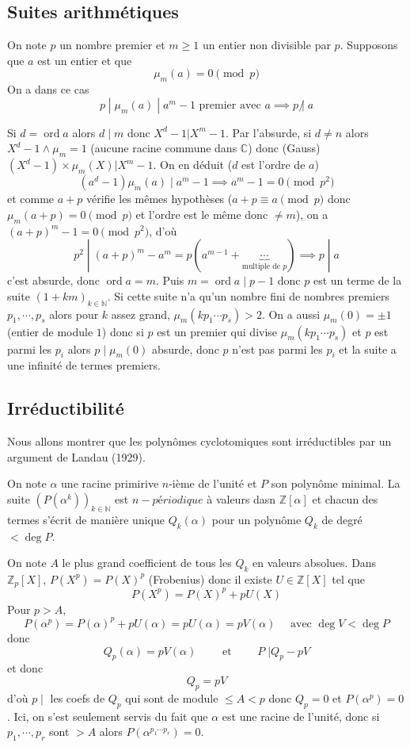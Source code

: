 \documentclass{article}
\theoremstyle{definition}
\DeclareMathOperator{\ord}{ord}
\begin{document}
\subsection{Suites arithmétiques}

On note $p$ un nombre premier et $m\geq 1$ un entier non divisible par $p$. Supposons que $a$ est un entier et que \[
    \mu_m(a)= 0\pmod p
\]
On a dans ce cas \[
    p\;|\;\mu_m(a)\;|\;a^m-1 \text{ premier avec }a \implies p\;\not|\;a
\]

Si $d=\ord a$ alors $d\;|\; m$ donc $X^d-1|X^m-1$. Par l'absurde, si $d\neq n$ alors $X^d-1\land \mu_m=1$ (aucune racine commune dans $\mathbb C$) donc (Gauss) $(X^d-1)\times \mu_m(X)|X^m-1$. On en déduit ($d$ est l'ordre de $a$) \[
    (a^d-1)\mu_m(a)\;|\;a^m-1 \implies a^m-1=0\pmod {p^2}
\]
et comme $a+p$ vérifie les mêmes hypothèses ($a+p\equiv a\pmod p$ donc $\mu_m(a+p)=0\pmod {p}$ et l'ordre est le même donc $\neq m$), on a $(a+p)^m-1= 0\pmod {p^2}$, d'où \[
    p^2\;|\; (a+p)^m-a^m=p\left(a^{m-1}+\underbrace{\cdots}_{\text{multiple de }p}\right) \implies p\;|\; a
\]
c'est absurde, donc $\ord a = m$. Puis $m=\ord a\;|\;p-1$ donc $p$ est un terme de la suite $(1+km)_{k\in\mathbb N}$. Si cette suite n'a qu'un nombre fini de nombres premiers $p_1, \cdots, p_s$ alors pour $k$ assez grand, $\mu_m(kp_1\cdots p_s)>2$. On a aussi $\mu_m(0)=\pm 1$ (entier de module $1$) donc si $p$ est un premier qui divise $\mu_m(kp_1\cdots p_s)$ et $p$ est parmi les $p_i$ alors $p\;|\; \mu_m(0)$ absurde, donc $p$ n'est pas parmi les $p_i$ et la suite a une infinité de termes premiers.

\subsection{Irréductibilité}

Nous allons montrer que les polynômes cyclotomiques sont irréductibles par un argument de Landau (1929).

On note $\alpha$ une racine primirive $n$-ième de l'unité et $P$ son polynôme minimal. La suite $(P(\alpha^k))_{k\in\mathbb N}$ est $n-périodique$ à valeurs dasn $\mathbb Z[\alpha]$ et chacun des termes s'écrit  de manière unique $Q_k(\alpha)$ pour un polynôme $Q_k$ de degré $<\deg P$.

On note $A$ le plus grand coefficient de tous les $Q_k$ en valeurs absolues. Dans $\mathbb Z_p[X]$, $P(X^p)=P(X)^p$ (Frobenius) donc il existe $U\in\mathbb Z[X]$ tel que \[
    P(X^p)=P(X)^p+pU(X)
\]
Pour $p>A$, \[
    P(\alpha^p)=P(\alpha)^p+pU(\alpha)=pU(\alpha)=pV(\alpha) \quad \text{ avec }\deg V<\deg P
\]
donc \[
    Q_p(\alpha)=pV(\alpha) \qquad \text{ et }\qquad P\;|Q_p-pV
\]
et donc \[
    Q_p=pV
\]
d'où $p\;|\;$ les coefs de $Q_p$ qui sont de module $\leq A<p$ donc $Q_p=0$ et $P(\alpha^p)=0$. Ici, on s'est seulement servis du fait que $\alpha$ est une racine de l'unité, donc si $p_1, \cdots, p_r$ sont $>A$ alors $P(\alpha^{p_1\cdots p_r})=0$.
\end{document}
